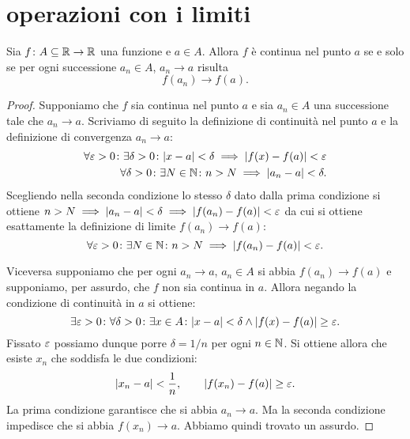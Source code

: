 \section{operazioni con i limiti}

\begin{theorem}%
\label{th:cont_sequenziale}%
%
%
Sia $f\colon A \subseteq \mathbb R \to \mathbb R$ una funzione e $a\in A$.
Allora $f$ è continua nel punto $a$ se e solo se per ogni successione
$a_n\in A$, $a_n\to a$ risulta
\[
   f(a_n) \to f(a).
\]
\end{theorem}
%
\begin{proof}
Supponiamo che $f$ sia continua nel punto $a$ e sia $a_n\in A$
una successione tale che
$a_n \to a$. Scriviamo di seguito la definizione di continuità nel punto $a$
e la definizione di convergenza $a_n \to a$:
\begin{align*}
  \forall \varepsilon>0 \colon \exists \delta>0\colon
  {\left|x-a\right|}< \delta \implies {\left|f(x)-f(a)\right|}< \varepsilon \\
  \forall \delta>0 \colon \exists N\in \mathbb N \colon
  n>N \implies {\left|a_n-a\right|} < \delta.
\end{align*}
Scegliendo nella seconda condizione lo stesso $\delta$ dato dalla prima
condizione si ottiene $n>N \implies {\left|a_n-a\right|}< \delta \implies {\left|f(a_n)-f(a)\right|}
<\varepsilon$ da cui si ottiene esattamente la definizione di limite $f(a_n)\to f(a)$:
\[
  \forall \varepsilon>0\colon \exists N\in \mathbb N\colon
  n>N\implies {\left|f(a_n)-f(a)\right|} < \varepsilon.
\]

Viceversa supponiamo che per ogni $a_n\to a$, $a_n\in A$
si abbia $f(a_n)\to f(a)$ e supponiamo,
per assurdo, che $f$ non sia continua in $a$. Allora negando la
condizione di continuità in $a$ si ottiene:
\[
  \exists \varepsilon>0 \colon \forall \delta>0 \colon \exists x\in A\colon
  {\left|x-a\right|}<\delta \land {\left|f(x)-f(a)\right|}\ge \varepsilon.
\]
Fissato $\varepsilon$ possiamo dunque porre $\delta = 1/n$ per ogni $n\in \mathbb N$.
Si ottiene allora che esiste $x_n$ che soddisfa le due condizioni:
\[
  {\left|x_n-a\right|}<\frac 1 n, \qquad {\left|f(x_n)-f(a)\right|}\ge \varepsilon.
\]
La prima condizione garantisce che si abbia $a_n \to a$.
Ma la seconda condizione impedisce che si abbia $f(x_n)\to a$.
Abbiamo quindi trovato un assurdo.
\end{proof}

